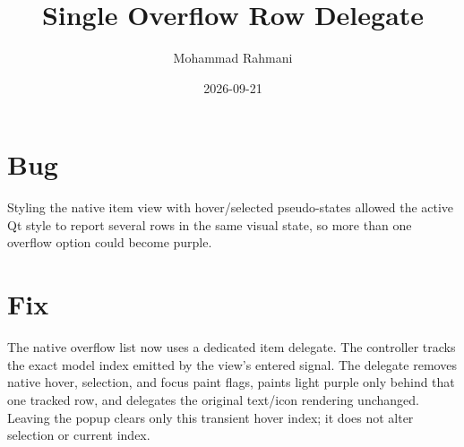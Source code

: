 \documentclass[a4paper]{article}
\title{Single Overflow Row Delegate}
\date{2026-09-21}
\author{Mohammad Rahmani}
\begin{document}
   \maketitle

   \begin{preview}
      \section{Bug}
      Styling the native item view with hover/selected pseudo-states allowed the
      active Qt style to report several rows in the same visual state, so more
      than one overflow option could become purple.

      \section{Fix}
      The native overflow list now uses a dedicated item delegate. The
      controller tracks the exact model index emitted by the view's entered
      signal. The delegate removes native hover, selection, and focus paint
      flags, paints light purple only behind that one tracked row, and delegates
      the original text/icon rendering unchanged. Leaving the popup clears only
      this transient hover index; it does not alter selection or current index.
   \end{preview}

   
   
\end{document}
